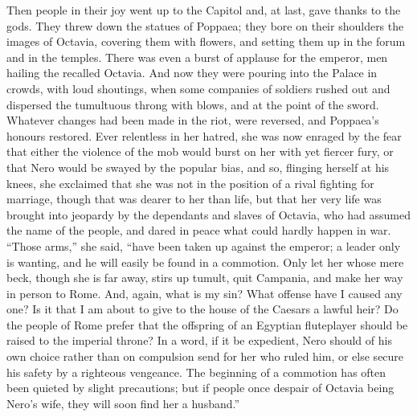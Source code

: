 
Then people in their joy went up to the Capitol and, at last, gave thanks to the gods. They threw down the statues of Poppaea; they bore on their shoulders the images of Octavia, covering them with flowers, and setting them up in the forum and in the temples. There was even a burst of applause for the emperor, men hailing the recalled Octavia. And now they were pouring into the Palace in crowds, with loud shoutings, when some companies of soldiers rushed out and dispersed the tumultuous throng with blows, and at the point of the sword. Whatever changes had been made in the riot, were reversed, and Poppaea's honours restored. Ever relentless in her hatred, she was now enraged by the fear that either the violence of the mob would burst on her with yet fiercer fury, or that Nero would be swayed by the popular bias, and so, flinging herself at his knees, she exclaimed that she was not in the position of a rival fighting for marriage, though that was dearer to her than life, but that her very life was brought into jeopardy by the dependants and slaves of Octavia, who had assumed the name of the people, and dared in peace what could hardly happen in war. ``Those arms,'' she said, ``have been taken up against the emperor; a leader only is wanting, and he will easily be found in a commotion. Only let her whose mere beck, though she is far away, stirs up tumult, quit Campania, and make her way in person to Rome. And, again, what is my sin? What offense have I caused any one? Is it that I am about to give to the house of the Caesars a lawful heir? Do the people of Rome prefer that the offspring of an Egyptian fluteplayer should be raised to the imperial throne? In a word, if it be expedient, Nero should of his own choice rather than on compulsion send for her who ruled him, or else secure his safety by a righteous vengeance. The beginning of a commotion has often been quieted by slight precautions; but if people once despair of Octavia being Nero's wife, they will soon find her a husband.''


